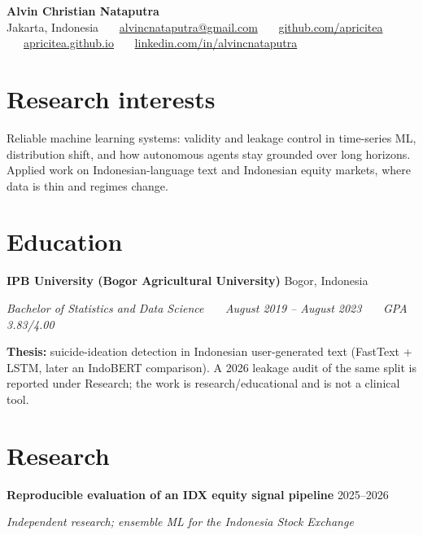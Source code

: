 \documentclass[11pt,a4paper]{article}
\newcommand{\heading}[2]{\textbf{#1} \hfill {\small\color{muted}#2}\par}
\newcommand{\subheading}[1]{\textit{\small #1}\par}
\begin{document}
\begin{center}
  {\LARGE\bfseries Alvin Christian Nataputra}\\[0.35em]
  {\small Jakarta, Indonesia \ \textbullet\ \
  \href{mailto:alvincnataputra@gmail.com}{alvincnataputra@gmail.com} \ \textbullet\ \
  \href{https://github.com/apricitea}{github.com/apricitea} \ \textbullet\ \
  \href{https://apricitea.github.io}{apricitea.github.io} \ \textbullet\ \
  \href{https://linkedin.com/in/alvincnataputra}{linkedin.com/in/alvincnataputra}}
\end{center}

\vspace{-0.4em}

\section{Research interests}

Reliable machine learning systems: validity and leakage control in time-series ML,
distribution shift, and how autonomous agents stay grounded over long horizons. Applied
work on Indonesian-language text and Indonesian equity markets, where data is thin and
regimes change.

\section{Education}

\heading{IPB University (Bogor Agricultural University)}{Bogor, Indonesia}
\subheading{Bachelor of Statistics and Data Science \ \textbullet\ \ August 2019 -- August 2023 \ \textbullet\ \ GPA 3.83/4.00}

\textbf{Thesis:} suicide-ideation detection in Indonesian user-generated text
(FastText + LSTM, later an IndoBERT comparison). A 2026 leakage audit of the same
split is reported under Research; the work is research/educational and is not a
clinical tool.

\section{Research}

\heading{Reproducible evaluation of an IDX equity signal pipeline}{2025--2026}
\subheading{Independent research; ensemble ML for the Indonesia Stock Exchange}
\end{document}
